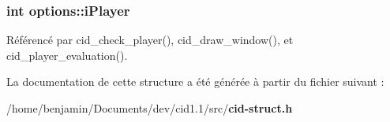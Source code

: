 \subsubsection{\setlength{\rightskip}{0pt plus 5cm}int {\bf options::iPlayer}}\label{structoptions_4b97212299be4d4077f2eb0444392207}




Référencé par cid\_\-check\_\-player(), cid\_\-draw\_\-window(), et cid\_\-player\_\-evaluation().

La documentation de cette structure a été générée à partir du fichier suivant :\begin{CompactItemize}
\item 
/home/benjamin/Documents/dev/cid1.1/src/{\bf cid-struct.h}\end{CompactItemize}
